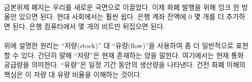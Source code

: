 \paragraph{}
\begin{comment}	
	The abolishment of the gold standard gave way to a new reality: adding new money
	requires just a drop of ink. In our modern world adding a couple of zeros to the
	balance of a bank account requires even less effort: flipping a few bits in a
	bank computer is enough.
\end{comment}
금본위제 폐지는 우리를 새로운 국면으로 이끌었다.
이제 화폐 발행을 위해 잉크 한 방울만 있으면 된다.
현대 사회에서는 훨씬 쉽다. 은행 계좌 잔액에 0 몇 개를 더 추가하면 된다.
은행 컴퓨터에서 몇 개의 비트만 뒤집으면 된다.

\paragraph{}
\begin{comment}	
	The principle outlined above can be expressed more generally as the
	ratio of \enquote{stock} to \enquote{flow}. Simply put, the \textit{stock} is how much of
	something is currently there. For our purposes, the stock is a measure
	of the current money supply. The \textit{flow} is how much there is produced
	over a period of time (e.g. per year). The key to understanding sound
	money is in understanding this stock-to-flow ratio.
\end{comment}
위에 설명한 원리는 \enquote{저량(stock)} 대 \enquote{유량(flow)}을 사용하여 좀 더 일반적으로 표현할 수 있다.
간단히 말해 \enquote{저량}은 현재 존재하는 양을 말한다. 여기에서는 현재 통화 공급량을 의미한다. 
\enquote{유량}은 일정 기간 동안의 생산량을 나타낸다.
건전 화폐 이해의 핵심은 이 저량 대 유량 비율을 이해하는 것이다.

